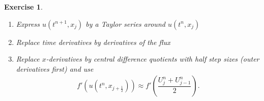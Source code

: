 \documentclass[10pt,letterpaper]{article}
\theoremstyle{break}
\newtheorem{exercise}{Exercise}
\begin{document}
\begin{exercise}
\begin{enumerate}
        \begin{enumerate}
            \item Express $u(t^{n+1},x_{j})$ by a Taylor series around $u(t^{n},x_{j})$
            \item Replace time derivatives by derivatives of the flux
            \item Replace $x$-derivatives by central difference quotients with half step sizes (outer derivatives first) and use 
			\begin{align*}
				f'(u(t^{n},x_{j+\frac 1 2}))
				\approx 
				f'\left( \dfrac{ U^{n}_{j} + U^{n}_{j-1} }{2} \right)
				.
			\end{align*}
        \end{enumerate}
    \end{enumerate}

\end{exercise}
\end{document}

